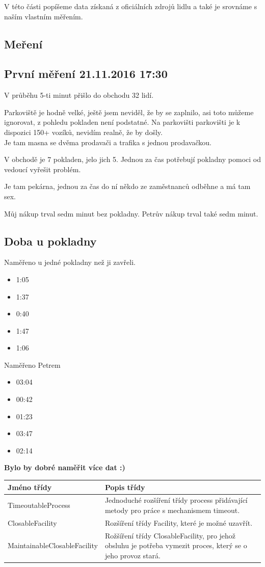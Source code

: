 \documentclass[12pt,a4paper,titlepage]{article}
\begin{document}
V této části popíšeme data získaná z oficiálních zdrojů lidlu a také je srovnáme s naším vlastním měřením.
\subsection{Meření}
\subsection{První měření 21.11.2016 17:30}
V průběhu 5-ti minut přišlo do obchodu 32 lidí.

Parkoviště je hodně velké, ještě jsem neviděl, že by se zaplnilo, asi toto můžeme ignorovat, z pohledu pokladen není podstatné.
Na parkovišti parkovišti je k dispozici 150+ vozíků, nevidím realně, že by došly.
\\
Je tam masna se dvěma prodavači a trafika s jednou prodavačkou.

V obchodě je 7 pokladen, jelo jich 5. Jednou za čas potřebují pokladny pomoci od vedoucí vyřešit problém.

Je tam pekárna, jednou za čas do ní někdo ze zaměstnanců odběhne a má tam sex.

Můj nákup trval sedm minut bez pokladny. Petrův nákup trval také sedm minut.

\subsection{Doba u pokladny}
Naměřeno u jedné pokladny než ji zavřeli.
\begin{itemize}
\item 1:05
\item 1:37
\item 0:40
\item 1:47
\item 1:06
\end{itemize}
Naměřeno Petrem
\begin{itemize}
\item 03:04
\item 00:42
\item 01:23
\item 03:47
\item 02:14
\end{itemize}


\textbf{Bylo by dobré naměřit více dat :) }


\begin{center}
    \begin{tabular}{| l | l | }
    \hline
    Jméno  třídy & Popis třídy  \\ \hline
    TimeoutableProcess & Jednoduché rozšíření třídy process přidávající metody pro práce s mechanismem timeout. \\ \hline
    ClosableFacility &  Rozšíření třídy Facility, které je možné uzavřít. \\ \hline
    MaintainableClosableFacility & Rožšíření třídy ClosableFacility, pro jehož obsluhu je potřeba vymezit proces, který se o jeho provoz stará.  \\
    \hline
    \end{tabular}
\end{center}
\end{document}
